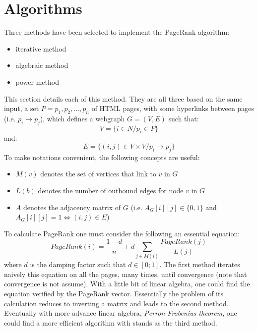\documentclass[pdftex,12pt,a4paper]{article}
\begin{document}
\section{Algorithms}

Three methods have been selected to implement the PageRank algorithm:
\begin{itemize}
\item iterative method
\item algebraic method
\item power method
\end{itemize}
This section details each of this method. They are all three based on the same input, a set $P = p_1, p_2, ..., p_n$ of HTML pages, with some hyperlinks between pages (i.e. $p_i \rightarrow p_j$), which defines a webgraph $G = \left(V, E\right)$ such that:
$$V = \{i \in N / p_i \in P\}$$
and:
$$E = \{\left(i, j\right) \in V \times V / p_i \rightarrow p_j\}$$
To make notations convenient, the following concepts are useful:
\begin{itemize}
\item $M\left(v\right)$ denotes the set of vertices that link to $v$ in $G$
\item $L\left(b\right)$ denotes the number of outbound edges for node $v$ in $G$
\item $A$ denotes the adjacency matrix of $G$ (i.e. $A_G\left[i\right]\left[j\right] \in \{0, 1\}$ and $A_G\left[i\right]\left[j\right] = 1 \Leftrightarrow \left(i, j\right) \in E$)
\end{itemize}

To calculate PageRank one must consider the following an essential equation:
$$ PageRank \left( i \right) = \frac{1 - d}{n} + d \sum\limits_{j \in M \left( i \right)} \frac{PageRank \left( j \right)}{L \left( j \right)}$$
where $d$ is the damping factor such that $d \in \left[ 0;1 \right] $. The first method iterates naively this equation on all the pages, many times, until convergence (note that convergence is not assume). With a little bit of linear algebra, one could find the equation verified by the PageRank vector. Essentially the problem of its calculation reduces to inverting a matrix and leads to the second method. Eventually with more advance linear algebra, \emph{Perron-Frobenius theorem}, one could find a more efficient algorithm with stands as the third method.
\end{document}
